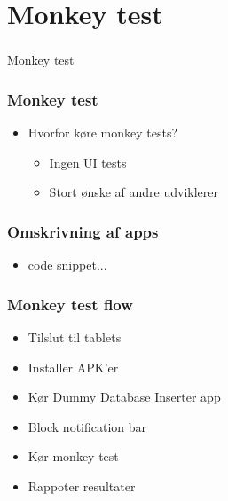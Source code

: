 \section[Monkey test]{Monkey test}
\begin{frame}
  \frametitle{}
  \begin{center}
    {\Huge Monkey test}
  \end{center}
\end{frame}

\begin{frame}
  \frametitle{Monkey test}
  \begin{itemize}
    \item Hvorfor køre monkey tests?
    \begin{itemize}
      \item Ingen UI tests
      \item Stort ønske af andre udviklerer
    \end{itemize}
  \end{itemize}
\end{frame}

\begin{frame}
  \frametitle{Omskrivning af apps}
  \begin{itemize}
    \item code snippet...
  \end{itemize}
\end{frame}

\begin{frame}
  \frametitle{Monkey test flow}
  \begin{itemize}
    \item Tilslut til tablets
    \item Installer APK'er
    \item Kør Dummy Database Inserter app
    \item Block notification bar
    \item Kør monkey test
    \item Rappoter resultater
  \end{itemize}
\end{frame}

